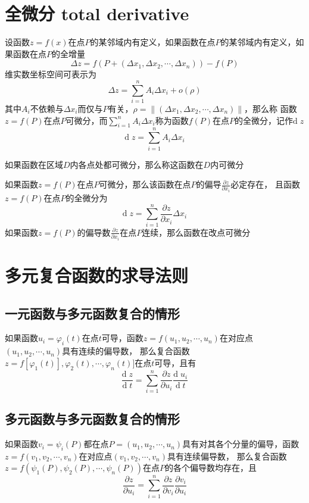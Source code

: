 \documentclass[UTF8]{ctexart}
\newcommand{\dif}[1]{{\text{d}\;\!#1}}
\begin{document}
\section*{全微分 total derivative}

\bigskip

设函数$z=f(x)$在点$P$的某邻域内有定义，如果函数在点$P$的某邻域内有定义，如果函数在点$P$的全增量
\[\Delta z=f(P+(\Delta x_1,\Delta x_2,\cdots,\Delta x_n))-f(P)\]
维实数坐标空间可表示为
\[\Delta z=\sum^n_{i=1}A_i\Delta x_i+o(\rho)\]
其中$A_i$不依赖与$\Delta x_i$而仅与$P$有关，$\rho=\|(\Delta x_1,\Delta x_2,\cdots,\Delta x_n)\|$，那么称
函数$z=f(P)$在点$P$可微分，而$\displaystyle \sum^n_{i=1}A_i\Delta x_i$称为函数$f(P)$在点$P$的全微分，记作$\dif{z}$
\[\dif{z}=\sum^n_{i=1}A_i\Delta x_i\]

\bigskip

如果函数在区域$D$内各点处都可微分，那么称这函数在$D$内可微分

\bigskip

如果函数$z=f(P)$在点$P$可微分，那么该函数在点$P$的偏导$\frac{\partial z}{\partial x_i}$必定存在，
且函数$z=f(P)$在点$P$的全微分为
\[\dif{z}=\sum^n_{i=1}\frac{\partial z}{\partial x_i}\Delta x_i\]
如果函数$z=f(P)$的偏导数$\frac{\partial z}{\partial x_i}$在点$P$连续，那么函数在改点可微分
\bigskip
\bigskip

\section*{多元复合函数的求导法则}

\bigskip

\subsection*{一元函数与多元函数复合的情形}
如果函数$u_i=\varphi_i(t)$在点$t$可导，函数$z=f(u_1,u_2,\cdots,u_n)$在对应点$(u_1,u_2,\cdots,u_n)$具有连续的偏导数，
那么复合函数$z=f[\varphi_1(t)],\varphi_2(t),\cdots,\varphi_n(t)]$在点$t$可导，且有
\[\frac{\dif{z}}{\dif{t}}=\sum^n_{i=1}\frac{\partial z}{\partial u_i}\frac{\dif{u_i}}{\dif{t}}\]

\subsection*{多元函数与多元函数复合的情形}
如果函数$v_i=\psi_i(P)$都在点$P=(u_1,u_2,\cdots,u_n)$具有对其各个分量的偏导，函数$z=f(v_1,v_2,\cdots,v_n)$在对应点$(v_1,v_2,\cdots,v_n)$具有连续偏导数，
那么复合函数$z=f(\psi_1(P),\psi_2(P),\cdots,\psi_n(P))$在点$P$的各个偏导数均存在，且
\[\frac{\partial z}{\partial u_i} = \sum^n_{i=1}\frac{\partial z}{\partial v_i}\frac{\partial v_i}{\partial u_i}\]
\end{document}

